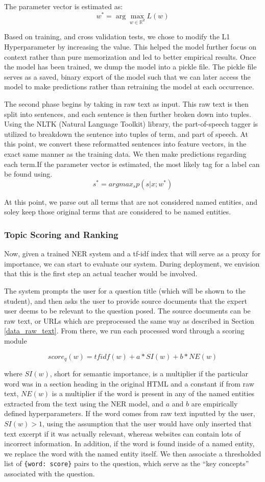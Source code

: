 \documentclass[11pt,a4paper]{article}
\begin{document}
The parameter vector is estimated as:
$$w^* = \arg\max_{w\in \mathbb{R}^d}L(w)$$

Based on training, and cross validation tests, we chose to modify the L1 Hyperparameter by increasing the value. This helped the model further focus on context rather than pure memorization and led to better empirical results. Once the model has been trained, we dump the model into a pickle file. The pickle file serves as a saved, binary export of the model such that we can later access the model to make predictions rather than retraining the model at each occurrence. 

The second phase begins by taking in raw text as input. This raw text is then split into sentences, and each sentence is then further broken down into tuples. Using the NLTK (Natural Language Toolkit) library, the part-of-speech tagger is utilized to breakdown the sentence into tuples of term, and part of speech. At this point, we convert these reformatted sentences into feature vectors, in the exact same manner as the training data. We then make predictions regarding each term.If the parameter vector is estimated, the most likely tag for a label can be found using.
$$s^* = argmax_{s}p(s|x;w^*)$$

At this point, we parse out all terms that are not considered named entities, and soley keep those original terms that are considered to be named entities. 
\subsubsection{Topic Scoring and Ranking}

Now, given a trained NER system and a tf-idf index that will serve as a proxy for importance, we can start to evaluate our system. During deployment, we envision that this is the first step an actual teacher would be involved. 

The system prompts the user for a question title (which will be shown to the student), and then asks the user to provide source documents that the expert user deems to be relevant to the question posed. The source documents can be raw text, or URLs which are preprocessed the same way as described in Section  \ref{data_raw_text}. From there, we run each processed word through a scoring module

$$score_q(w) = tfidf(w) + a*SI(w) + b*NE(w)$$

where $SI(w)$, short for semantic importance, is a multiplier if the particular word was in a section heading in the original HTML and a constant if from raw text, $NE(w)$ is a multiplier if the word is present in any of the named entities extracted from the text using the NER model, and $a$ and $b$ are empirically defined hyperparameters. If the word comes from raw text inputted by the user, $SI(w)>1$, using the assumption that the user would have only inserted that text excerpt if it was actually relevant, whereas websites can contain lots of incorrect information. In addition, if the word is found inside of a named entity, we replace the word with the named entity itself. We then associate a thresholded list of \texttt{\{word: score\}} pairs to the question, which serve as the “key concepts” associated with the question. 
\end{document}
